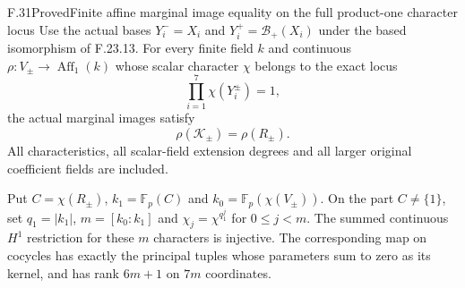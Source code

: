 \begin{claim}{F.31}{Proved}{Finite affine marginal image equality on the full product-one character locus}
Use the actual bases $Y_i^-=X_i$ and
$Y_i^+=\mathcal B_+(X_i)$ under the based
isomorphism of F.23.13.
For every finite field $k$ and continuous
$\rho:V_\pm\to\operatorname{Aff}_1(k)$ whose
scalar character $\chi$ belongs to the exact locus
\[
                         \prod_{i=1}^7\chi(Y_i^\pm)=1,
                                                               \tag{F.31.1}
\]
the actual marginal images satisfy
\[
                         \rho(\mathcal K_\pm)=\rho(R_\pm).
                                                               \tag{F.31.2}
\]
All characteristics, all scalar-field extension
degrees and all larger original coefficient
fields are included.

Put $C=\chi(R_\pm)$,
$k_1=\mathbb F_p(C)$ and
$k_0=\mathbb F_p(\chi(V_\pm))$.
On the part $C\ne\{1\}$, set
$q_1=|k_1|$, $m=[k_0:k_1]$ and
$\chi_j=\chi^{q_1^j}$ for $0\leq j<m$.
The summed continuous $H^1$ restriction
for these $m$ characters is injective.
The corresponding map on cocycles has
exactly the principal tuples whose
parameters sum to zero as its kernel,
and has rank $6m+1$ on $7m$ coordinates.
\end{claim}

